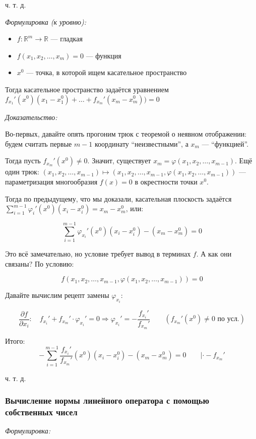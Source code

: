 \documentclass{article}
\begin{document}
ч. т. д.

\textit{Формулировка (к уровню):}

\begin{itemize}
    \item $f: \mathbb{R}^m \rightarrow \mathbb{R}$ --- гладкая
    \item $f(x_1, x_2, \ldots, x_m) = 0$ --- функция
    \item $x^0$ --- точка, в которой ищем касательное пространство
\end{itemize}

Тогда касательное пространство задаётся уравнением $f_{x_1}'(x^0)(x_1 - x^0_1) + \ldots + f_{x_m}'(x_m - x^0_m)) = 0$

\textit{Доказательство:}

Во-первых, давайте опять прогоним трюк с теоремой о неявном отображении: будем считать первые $m - 1$ координату ``неизвестными'', а $x_m$ --- ``функцией''.

Тогда пусть $f_{x_m}'(x^0) \neq 0$. Значит, существует $x_m = \varphi(x_1, x_2, \ldots, x_{m - 1})$. Ещё один трюк: $(x_1, x_2, \ldots, x_{m - 1}) \mapsto (x_1, x_2, \ldots, x_{m - 1}, \varphi(x_1, x_2, \ldots, x_{m - 1}))$ --- параметризация многообразия $f(x) = 0$ в окрестности точки $x^0$.

Тогда по предыдущему, что мы доказали, касательная плоскость задаётся $\sum_{i = 1}^{m - 1} \varphi_i'(x^0)(x_i - x^0_i) = x_m - x^0_m$, или:

\[\sum_{i = 1}^{m - 1} \varphi_{x_i}'(x^0)(x_i - x^0_i) - (x_m - x^0_m) = 0\]

Это всё замечательно, но условие требует вывод в терминах $f$. А как они связаны? По условию:

\[f(x_1, x_2, \ldots, x_{m - 1}, \varphi(x_1, x_2, \ldots, x_{m - 1})) = 0\]

Давайте вычислим рецепт замены $\varphi_{x_i}$:

\[\frac{\partial f}{\partial x_i}: \quad f_{x_i}' + f_{x_m}' \cdot \varphi_{x_i}' = 0 \Rightarrow \varphi_{x_i}' = - \frac{f_{x_i}'}{f_{x_m}'} \qquad \left(f_{x_m}'(x^0) \neq 0 \text{ по усл.}\right)\]

Итого:
\[-\sum_{i = 1}^{m - 1} \frac{f_{x_i}'}{f_{x_m}'}(x^0)(x_i - x^0_i) - (x_m - x^0_m) = 0 \qquad | \cdot -f_{x_m}'\]

ч. т. д.

\subsubsection{Вычисление нормы линейного оператора с помощью собственных чисел}
\textit{Формулировка:}
\end{document}

